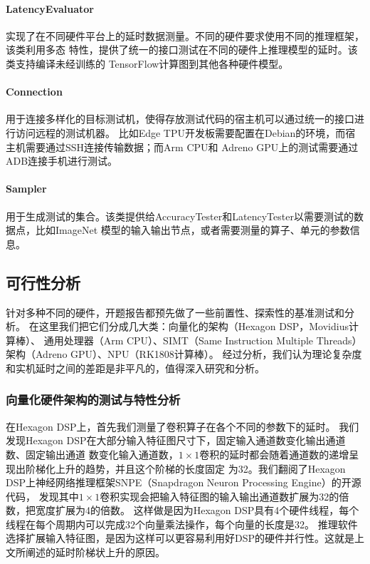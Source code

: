 \paragraph{LatencyEvaluator}
实现了在不同硬件平台上的延时数据测量。不同的硬件要求使用不同的推理框架，该类利用多态
特性，提供了统一的接口测试在不同的硬件上推理模型的延时。该类支持编译未经训练的
TensorFlow计算图到其他各种硬件模型。

\paragraph{Connection}
用于连接多样化的目标测试机，使得存放测试代码的宿主机可以通过统一的接口进行访问远程的测试机器。
比如Edge TPU开发板需要配置在Debian的环境，而宿主机需要通过SSH连接传输数据；而Arm CPU和
Adreno GPU上的测试需要通过ADB连接手机进行测试。

\paragraph{Sampler}
用于生成测试的集合。该类提供给AccuracyTester和LatencyTester以需要测试的数据点，比如ImageNet
模型的输入输出节点，或者需要测量的算子、单元的参数信息。

\subsection{可行性分析}
针对多种不同的硬件，开题报告都预先做了一些前置性、探索性的基准测试和分析。
在这里我们把它们分成几大类：向量化的架构（Hexagon DSP，Movidius计算棒）、
通用处理器（Arm CPU）、SIMT（Same Instruction Multiple Threads）架构（Adreno GPU）、NPU（RK1808计算棒）。
经过分析，我们认为理论复杂度和实机延时之间的差距是非平凡的，值得深入研究和分析。

\subsubsection{向量化硬件架构的测试与特性分析}
在Hexagon DSP上，首先我们测量了卷积算子在各个不同的参数下的延时。
我们发现Hexagon DSP在大部分输入特征图尺寸下，固定输入通道数变化输出通道数、固定输出通道
数变化输入通道数，$1\times 1$卷积的延时都会随着通道数的递增呈现出阶梯化上升的趋势，并且这个阶梯的长度固定
为32。我们翻阅了Hexagon DSP上神经网络推理框架SNPE（Snapdragon Neuron Processing Engine）的开源代码，
发现其中$1\times 1$卷积实现会把输入特征图的输入输出通道数扩展为32的倍数，把宽度扩展为4的倍数。
这样做是因为Hexagon DSP具有4个硬件线程，每个线程在每个周期内可以完成32个向量乘法操作，每个向量的长度是32。
推理软件选择扩展输入特征图，是因为这样可以更容易利用好DSP的硬件并行性。这就是上文所阐述的延时阶梯状上升的原因。


